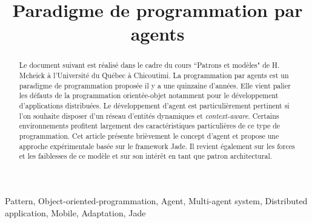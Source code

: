 \documentclass[conference]{IEEEtran}
\begin{document}
\title{Paradigme de programmation par agents}

\author{
\and
{}
}

\maketitle

\begin{abstract}
\fontsize{10pt}{12pt}\selectfont
\textmd{
Le document suivant est réalisé dans le cadre du cours ``Patrons et modèles" de H. Mcheick à l'Université du Québec à Chicoutimi. La programmation par agents est un paradigme de programmation proposée il y a une quinzaine d'années. Elle vient palier les défauts de la programmation orientée-objet notamment pour le développement d'applications distribuées. Le développement d'agent est particulièrement pertinent si l'on souhaite disposer d'un réseau d'entités dynamiques et \textit{context-aware}. Certains environnements profitent largement des caractéristiques particulières de ce type de programmation. Cet article présente brièvement le concept d'agent et propose une approche expérimentale basée sur le framework Jade. Il revient également sur les forces et les faiblesses de ce modèle et sur son intérêt en tant que patron architectural.\\
}
\end{abstract}

\begin{IEEEkeywords}
\textmd{
Pattern, Object-oriented-programmation, Agent, Multi-agent system, Distributed application, Mobile, Adaptation, Jade}
\end{IEEEkeywords}
\end{document}

